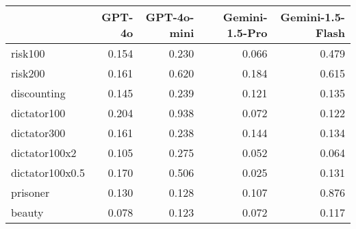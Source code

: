 \begin{tabular}{lrrrr}
\toprule
 & GPT-4o & GPT-4o-mini & Gemini-1.5-Pro & Gemini-1.5-Flash \\
\midrule
risk100 & 0.154 & 0.230 & 0.066 & 0.479 \\
risk200 & 0.161 & 0.620 & 0.184 & 0.615 \\
discounting & 0.145 & 0.239 & 0.121 & 0.135 \\
dictator100 & 0.204 & 0.938 & 0.072 & 0.122 \\
dictator300 & 0.161 & 0.238 & 0.144 & 0.134 \\
dictator100x2 & 0.105 & 0.275 & 0.052 & 0.064 \\
dictator100x0.5 & 0.170 & 0.506 & 0.025 & 0.131 \\
prisoner & 0.130 & 0.128 & 0.107 & 0.876 \\
beauty & 0.078 & 0.123 & 0.072 & 0.117 \\
\bottomrule
\end{tabular}
